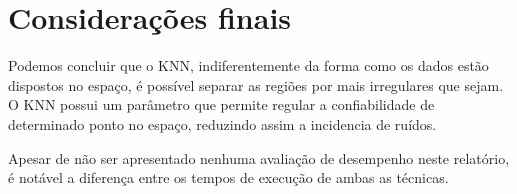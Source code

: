 \documentclass[ 
	article,			%
	11pt,				%
	oneside,			%
	a4paper,			%
	english,			%
	brazil,				%
	]{abntex2}
\begin{document}
 
 
 
% 

\section*{Considerações finais}
Podemos concluir que o KNN,  indiferentemente da forma como os dados estão
dispostos no espaço, é possível separar as regiões por mais irregulares que
sejam. O KNN possui um parâmetro que permite regular a confiabilidade de
determinado ponto no espaço, reduzindo assim a incidencia de ruídos.

Apesar de não ser apresentado nenhuma avaliação de desempenho neste relatório, é
notável a diferença entre os tempos de execução de ambas as técnicas.
 






\postextual



%
% 

\end{document}
